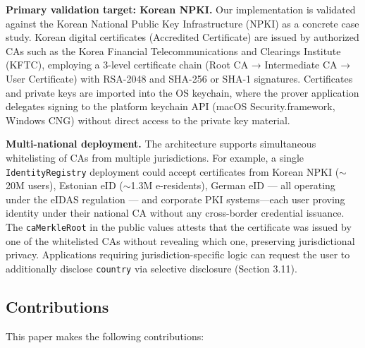 \documentclass[11pt, a4paper]{article}
\begin{document}
\textbf{Primary validation target: Korean NPKI.} Our implementation is
validated against the Korean National Public Key Infrastructure (NPKI)
as a concrete case study. Korean digital certificates (Accredited Certificate) are
issued by authorized CAs such as the Korea Financial Telecommunications
and Clearings Institute (KFTC), employing a 3-level certificate
chain (Root CA → Intermediate CA → User Certificate) with RSA-2048 and
SHA-256 or SHA-1 signatures. Certificates and private keys are imported
into the OS keychain, where the prover application delegates signing to
the platform keychain API (macOS Security.framework, Windows CNG) without
direct access to the private key material.

\textbf{Multi-national deployment.} The architecture supports
simultaneous whitelisting of CAs from multiple jurisdictions. For
example, a single \texttt{IdentityRegistry} deployment could accept
certificates from Korean NPKI ($\sim$20M users), Estonian eID
($\sim$1.3M e-residents), German eID --- all operating under
the eIDAS regulation \cite{ref26} --- and corporate PKI systems---each user
proving identity under their national CA without any cross-border
credential issuance. The \texttt{caMerkleRoot} in the public values
attests that the certificate was issued by one of the whitelisted CAs
without revealing which one, preserving jurisdictional privacy.
Applications requiring jurisdiction-specific logic can request the user
to additionally disclose \texttt{country} via selective disclosure
(Section 3.11).

\subsection{Contributions}\label{contributions}

This paper makes the following contributions:
\end{document}
